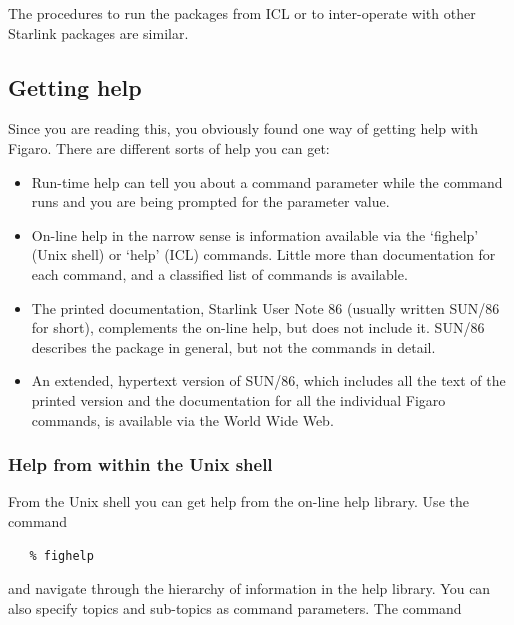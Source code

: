 \documentclass[11pt,twoside]{article}
\newcommand{\xlabel}[1]{}
\begin{document}
   The procedures to run the packages from ICL or to inter-operate with
   other Starlink packages are similar.


\subsection{\xlabel{getting_help}\label{gethelp}Getting help}

   Since you are reading this, you obviously found one way of getting
   help with Figaro. There are different sorts of help you can get:

\begin{itemize}
\item
   Run-time help can tell you about a command parameter while the
   command runs and you are being prompted for the parameter value.
\item
   On-line help in the narrow sense is information available via the
   `fighelp' (Unix shell) or `help' (ICL) commands.  Little more than
   documentation for each command, and a classified list of commands is
   available.
\item
   The printed documentation, Starlink User Note 86 (usually written
   SUN/86 for short), complements the on-line help, but does not include
   it.  SUN/86 describes the package in general, but not the commands in
   detail.
\item
   An extended, hypertext version of SUN/86, which includes all the
   text of the printed version and the documentation for all the individual
   Figaro commands, is available via the World Wide Web.
\end{itemize}


\subsubsection{\label{gethelpunix}Help from within the Unix shell}

   From the Unix shell you can get help from the on-line help library.
   Use the command

\begin{verbatim}
   % fighelp
\end{verbatim}

   and navigate through the hierarchy of information in the help
   library. You can also specify topics and sub-topics as command
   parameters. The command
\end{document}
